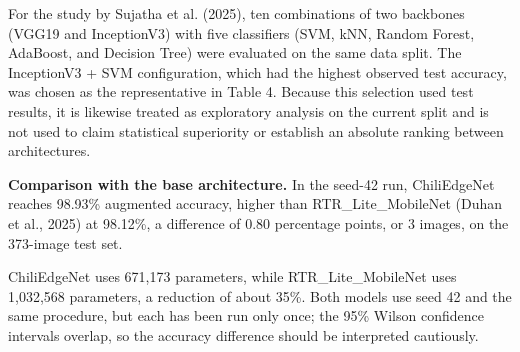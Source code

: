 For the study by Sujatha et al. (2025), ten combinations of two backbones (VGG19 and InceptionV3) with five classifiers (SVM, kNN, Random Forest, AdaBoost, and Decision Tree) were evaluated on the same data split. The InceptionV3 + SVM configuration, which had the highest observed test accuracy, was chosen as the representative in Table 4. Because this selection used test results, it is likewise treated as exploratory analysis on the current split and is not used to claim statistical superiority or establish an absolute ranking between architectures.

\textbf{Comparison with the base architecture.} In the seed-42 run, ChiliEdgeNet reaches 98.93\% augmented accuracy, higher than RTR\_Lite\_MobileNet (Duhan et al., 2025) at 98.12\%, a difference of 0.80 percentage points, or 3 images, on the 373-image test set.

ChiliEdgeNet uses 671,173 parameters, while RTR\_Lite\_MobileNet uses 1,032,568 parameters, a reduction of about 35\%. Both models use seed 42 and the same procedure, but each has been run only once; the 95\% Wilson confidence intervals overlap, so the accuracy difference should be interpreted cautiously.

